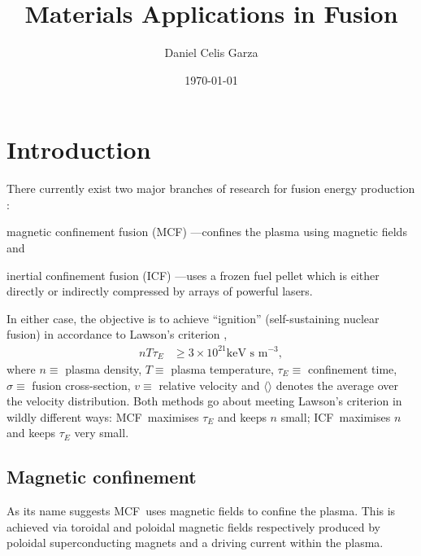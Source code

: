 \documentclass[12pt, a4paper]{article}
\title{Materials Applications in Fusion}
\author{Daniel Celis Garza}
\date{\today}
\newcommand{\mc}{MCF}
\newcommand{\ic}{ICF}
\begin{document}
	\maketitle
	\section{Introduction}\label{s:intro}
		There currently exist two major branches of research for fusion energy production \cite{icfvsmcf}:
		\begin{inparaenum}
			\item magnetic confinement fusion (\mc) \cite{mcf}---confines the plasma using magnetic fields and
			\item inertial confinement fusion (\ic) \cite{icf}---uses a frozen fuel pellet which is either directly or indirectly compressed by arrays of powerful lasers.
		\end{inparaenum}
		In either case, the objective is to achieve ``ignition'' (self-sustaining nuclear fusion) in accordance to Lawson's criterion \cite{lawson},
			\begin{align}
				n T \tau_{E} &\geq 3 \times 10^{21} \textrm{keV s m$^{-3}$},
			\end{align}
		where $ n \equiv $ plasma density, $ T \equiv $ plasma temperature, $ \tau_{E} \equiv $ confinement time, $ \sigma \equiv $ fusion cross-section, $ v \equiv $ relative velocity and $ \langle \rangle $ denotes the average over the velocity distribution. Both methods go about meeting Lawson's criterion in wildly different ways: \mc~maximises $ \tau_{E} $ and keeps $ n $ small; \ic~maximises $ n $ and keeps $ \tau_{E} $ very small.
		\subsection{Magnetic confinement}\label{s:mc}
			As its name suggests \mc~uses magnetic fields to confine the plasma. This is achieved via toroidal and poloidal magnetic fields respectively produced by poloidal superconducting magnets and a driving current within the plasma.
			
\end{document}
